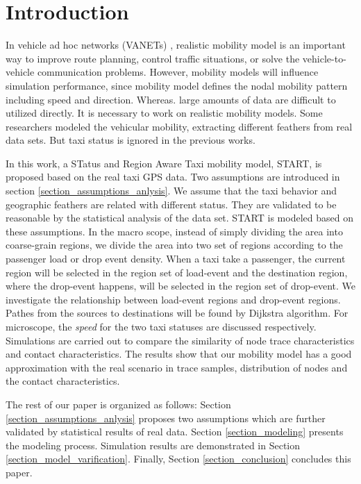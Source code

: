 \section{Introduction}
\label{section_introduction}

In vehicle ad hoc networks (VANETs) \cite{4068700}, realistic mobility model is an important way to improve route planning, control traffic situations, or solve the vehicle-to-vehicle communication problems. However, mobility models will influence simulation performance, since mobility model defines the nodal mobility pattern including speed and direction. Whereas. large amounts of data are difficult to utilized directly. It is necessary to work on realistic mobility models. Some researchers \cite{KimKotz-99,HuangZhu-88} modeled the vehicular mobility, extracting different feathers from real data sets. But taxi status is ignored in the previous works.

In this work, a STatus and Region Aware Taxi mobility model, START, is proposed based on the real taxi GPS data. Two assumptions are introduced in section \ref{section_assumptions_anlysis}. We assume that the taxi behavior and geographic feathers are related with different status. They are validated to be reasonable by the statistical analysis of the data set.
START is modeled based on these assumptions. In the macro scope, instead of simply dividing the area into coarse-grain regions, we divide the area into two set of regions according to the passenger load or drop event density. When a taxi take a passenger, the current region will be selected in the region set of load-event and the destination region, where the drop-event happens, will be selected in the region set of drop-event. We investigate the relationship between load-event regions and drop-event regions. Pathes from the sources to destinations will be found by Dijkstra algorithm. For microscope, the \emph{speed} for the two taxi statuses are discussed respectively.
Simulations are carried out to compare the similarity of node trace characteristics and contact characteristics. The results show that our mobility model has a good approximation with the real scenario in trace samples, distribution of nodes and the contact characteristics.

The rest of our paper is organized as follows: %
 Section \ref{section_assumptions_anlysis} proposes two assumptions which are further validated by statistical results of real data. Section \ref{section_modeling} presents the modeling process. Simulation results are demonstrated in Section \ref{section_model_varification}. Finally, Section \ref{section_conclusion} concludes this paper.


